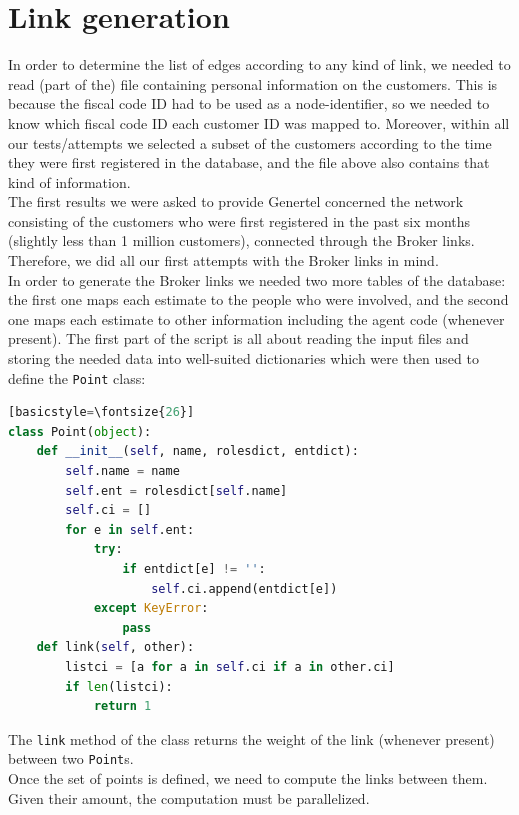 \documentclass[a4paper,11pt]{book}
\begin{document}
\section{Link generation}\label{sec:gen}
In order to determine the list of edges according to any kind of link, we needed to read (part of the) file containing personal information on the customers. This is because the fiscal code ID had to be used as a node-identifier, so we needed to know which fiscal code ID each customer ID was mapped to. 
Moreover, within all our tests/attempts we selected a subset of the customers according to the time they were first registered in the database, and the file above also contains that kind of information.\\
The first results we were asked to provide Genertel concerned the network consisting of the customers who were first registered in the past six months (slightly less than 1 million customers), connected through the Broker links. Therefore, we did all our first attempts with the Broker links in mind.\\
In order to generate the Broker links we needed two more tables of the database: the first one maps each estimate to the people who were involved, and the second one maps each estimate to other information including the agent code (whenever present). The first part of the script is all about reading the input files and storing the needed data into well-suited dictionaries which were then used to define the \lstinline!Point! class:
\begin{center}
\begin{lstlisting}[language=Python][basicstyle=\fontsize{26}]
class Point(object):
    def __init__(self, name, rolesdict, entdict):
        self.name = name
        self.ent = rolesdict[self.name]
        self.ci = []
        for e in self.ent:
            try:
                if entdict[e] != '':
                    self.ci.append(entdict[e])
            except KeyError:
                pass
    def link(self, other):
        listci = [a for a in self.ci if a in other.ci]
        if len(listci):
            return 1

\end{lstlisting}
\end{center}
The \lstinline!link! method of the class returns the weight of the link (whenever present) between two \lstinline!Point!s.\\

Once the set of points is defined, we need to compute the links between them. Given their amount, the computation must be parallelized.
\end{document}
